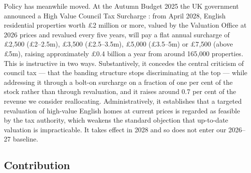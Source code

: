 Policy has meanwhile moved. At the Autumn Budget 2025 the UK government announced a High Value Council Tax Surcharge \citep{hmt2025}: from April 2028, English residential properties worth \pounds 2 million or more, valued by the Valuation Office at 2026 prices and revalued every five years, will pay a flat annual surcharge of \pounds 2{,}500 (\pounds 2--2.5m), \pounds 3{,}500 (\pounds 2.5--3.5m), \pounds 5{,}000 (\pounds 3.5--5m) or \pounds 7{,}500 (above \pounds 5m), raising approximately \pounds 0.4 billion a year from around 165{,}000 properties. This is instructive in two ways. Substantively, it concedes the central criticism of council tax --- that the banding structure stops discriminating at the top --- while addressing it through a bolt-on surcharge on a fraction of one per cent of the stock rather than through revaluation, and it raises around 0.7 per cent of the revenue we consider reallocating. Administratively, it establishes that a targeted revaluation of high-value English homes at current prices is regarded as feasible by the tax authority, which weakens the standard objection that up-to-date valuation is impracticable. It takes effect in 2028 and so does not enter our 2026--27 baseline.

\subsection{Contribution}

